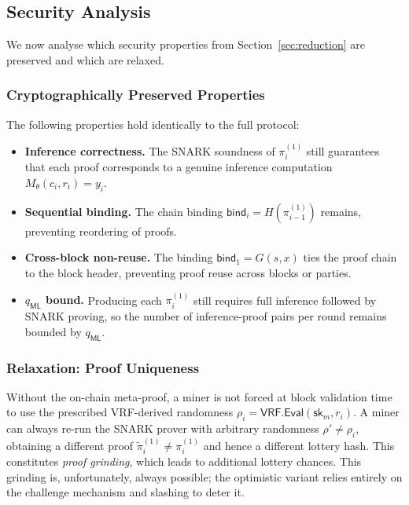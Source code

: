 \subsection{Security Analysis}

We now analyse which security properties from Section~\ref{sec:reduction} are preserved and which are relaxed.

\subsubsection{Cryptographically Preserved Properties}
The following properties hold identically to the full protocol:
\begin{itemize}[nosep]
    \item \textbf{Inference correctness.} The SNARK soundness of $\pi_i^{(1)}$ still guarantees that each proof corresponds to a genuine inference computation $M_\theta(c_i, r_i) = y_i$.
    \item \textbf{Sequential binding.} The chain binding $\mathsf{bind}_i = H(\pi_{i-1}^{(1)})$ remains, preventing reordering of proofs.
    \item \textbf{Cross-block non-reuse.} The binding $\mathsf{bind}_1 = G(s,x)$ ties the proof chain to the block header, preventing proof reuse across blocks or parties.
    \item \textbf{$q_{\mathsf{ML}}$ bound.} Producing each $\pi_i^{(1)}$ still requires full inference followed by SNARK proving, so the number of inference-proof pairs per round remains bounded by $q_{\mathsf{ML}}$.
\end{itemize}

\subsubsection{Relaxation: Proof Uniqueness}
\label{subsec:opt-relaxation}

Without the on-chain meta-proof, a miner is not forced at block validation time to use the prescribed VRF-derived randomness $\rho_i = \mathsf{VRF.Eval}(\mathsf{sk}_m, r_i)$. A miner can always re-run the SNARK prover with arbitrary randomness $\rho' \neq \rho_i$, obtaining a different proof $\tilde{\pi}_i^{(1)} \neq \pi_i^{(1)}$ and hence a different lottery hash. This constitutes \emph{proof grinding}, which leads to additional lottery chances. This grinding is, unfortunately, always possible; the optimistic variant relies entirely on the challenge mechanism and slashing to deter it.

